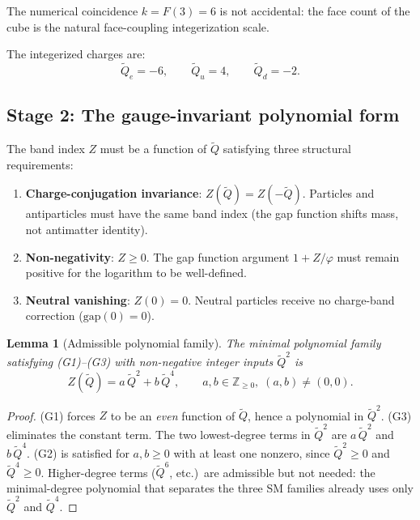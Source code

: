 \documentclass[11pt,a4paper]{article}
\newtheorem{lemma}[theorem]{Lemma}
\theoremstyle{definition}
\theoremstyle{remark}
\newcommand{\phig}{\varphi}
\newcommand{\tildeQ}{\tilde{Q}}
\newcommand{\Zidx}{Z}
\begin{document}
The numerical coincidence $k = F(3) = 6$ is not accidental: the face count
of the cube is the natural face-coupling integerization scale.

\medskip\noindent
The integerized charges are:
\begin{equation}
  \tildeQ_e = -6, \qquad \tildeQ_u = 4, \qquad \tildeQ_d = -2.
  \label{eq:Qtilde}
\end{equation}

\subsection{Stage 2: The gauge-invariant polynomial form}

The band index $\Zidx$ must be a function of $\tildeQ$ satisfying three
structural requirements:

\begin{enumerate}[nosep,label=(G\arabic*)]
  \item \textbf{Charge-conjugation invariance}: $\Zidx(\tildeQ) =
        \Zidx(-\tildeQ)$.  Particles and antiparticles must have the same
        band index (the gap function shifts mass, not antimatter identity).
  \item \textbf{Non-negativity}: $\Zidx \geq 0$.  The gap function argument
        $1 + \Zidx/\phig$ must remain positive for the logarithm to be
        well-defined.
  \item \textbf{Neutral vanishing}: $\Zidx(0) = 0$.  Neutral particles
        receive no charge-band correction ($\mathrm{gap}(0) = 0$).
\end{enumerate}

\begin{lemma}[Admissible polynomial family]
\label{lem:Z_poly_form}
The minimal polynomial family satisfying (G1)--(G3) with non-negative
integer inputs $\tildeQ^2$ is
\begin{equation}
  \Zidx(\tildeQ) = a\,\tildeQ^2 + b\,\tildeQ^4,
  \qquad a, b \in \mathbb{Z}_{\geq 0},\;
  (a, b) \neq (0, 0).
  \label{eq:Z_poly}
\end{equation}
\end{lemma}

\begin{proof}
(G1) forces $\Zidx$ to be an \emph{even} function of $\tildeQ$, hence a
polynomial in $\tildeQ^2$.  (G3) eliminates the constant term.  The two
lowest-degree terms in $\tildeQ^2$ are $a\,\tildeQ^2$ and $b\,\tildeQ^4$.
(G2) is satisfied for $a, b \geq 0$ with at least one nonzero, since
$\tildeQ^2 \geq 0$ and $\tildeQ^4 \geq 0$.  Higher-degree terms
($\tildeQ^6$, etc.)\ are admissible but not needed: the minimal-degree
polynomial that separates the three SM families already uses only
$\tildeQ^2$ and $\tildeQ^4$.
\end{proof}
\end{document}
